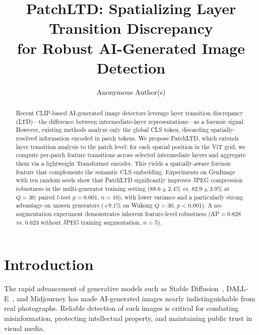 \documentclass[runningheads]{llncs}
\newcommand{\ours}{PatchLTD}
\newcommand{\vs}{\textit{vs.}}
\begin{document}
\title{PatchLTD: Spatializing Layer Transition Discrepancy\\for Robust AI-Generated Image Detection}

\author{Anonymous Author(s)}

\maketitle

\begin{abstract}
Recent CLIP-based AI-generated image detectors leverage layer transition discrepancy (LTD)---the difference between intermediate-layer representations---as a forensic signal.
However, existing methods analyze only the global CLS token, discarding spatially-resolved information encoded in patch tokens.
We propose \ours{}, which extends layer transition analysis to the patch level: for each spatial position in the ViT grid, we compute per-patch feature transitions across selected intermediate layers and aggregate them via a lightweight Transformer encoder.
This yields a spatially-aware forensic feature that complements the semantic CLS embedding.
Experiments on GenImage with ten random seeds show that \ours{} significantly improves JPEG compression robustness in the multi-generator training setting ($88.6{\pm}2.4\%$ \vs{} $82.9{\pm}3.9\%$ at $Q{=}30$; paired $t$-test $p{=}0.001$, $n{=}10$), with lower variance and a particularly strong advantage on unseen generators ($+9.1\%$ on Wukong $Q{=}30$, $p{<}0.001$).
A no-augmentation experiment demonstrates inherent feature-level robustness (AP$=$0.828 \vs{} 0.623 without JPEG training augmentation, $n{=}5$).

\end{abstract}

\section{Introduction}
\label{sec:intro}

The rapid advancement of generative models such as Stable Diffusion~\cite{rombach2022high}, DALL-E~\cite{ramesh2022dalle2}, and Midjourney has made AI-generated images nearly indistinguishable from real photographs.
Reliable detection of such images is critical for combating misinformation, protecting intellectual property, and maintaining public trust in visual media.
\end{document}
